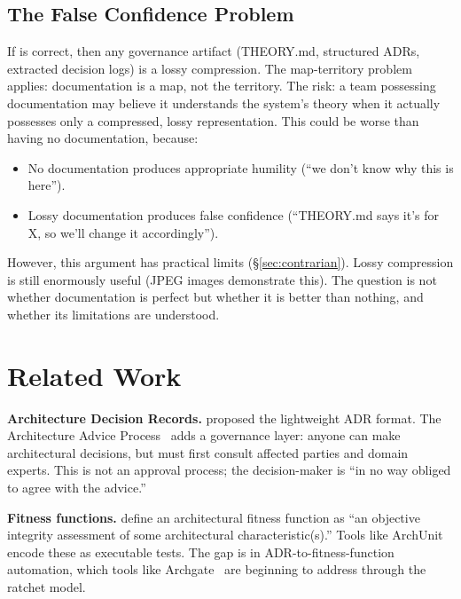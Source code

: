 \documentclass[11pt, a4paper, logo, copyright]{googledeepmind}
\begin{document}
\subsection{The False Confidence Problem}

If \citet{naur1985} is correct, then any governance artifact (THEORY.md, structured ADRs, extracted decision logs) is a lossy compression. The map-territory problem applies: documentation is a map, not the territory. The risk: a team possessing documentation may believe it understands the system's theory when it actually possesses only a compressed, lossy representation. This could be worse than having no documentation, because:

\begin{itemize}
    \item No documentation produces appropriate humility (``we don't know why this is here'').
    \item Lossy documentation produces false confidence (``THEORY.md says it's for X, so we'll change it accordingly'').
\end{itemize}

However, this argument has practical limits (\S\ref{sec:contrarian}). Lossy compression is still enormously useful (JPEG images demonstrate this). The question is not whether documentation is perfect but whether it is better than nothing, and whether its limitations are understood.


\section{Related Work}
\label{sec:related}

\textbf{Architecture Decision Records.} \citet{nygard2011} proposed the lightweight ADR format. The Architecture Advice Process~\citep{harmellaw2023} adds a governance layer: anyone can make architectural decisions, but must first consult affected parties and domain experts. This is not an approval process; the decision-maker is ``in no way obliged to agree with the advice.''

\textbf{Fitness functions.} \citet{ford2017} define an architectural fitness function as ``an objective integrity assessment of some architectural characteristic(s).'' Tools like ArchUnit encode these as executable tests. The gap is in ADR-to-fitness-function automation, which tools like Archgate~\citep{archgate} are beginning to address through the ratchet model.
\end{document}
